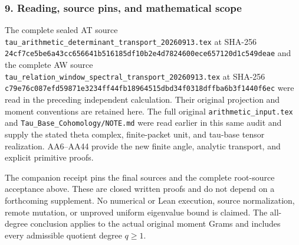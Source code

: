 \subsubsection{9. Reading, source pins, and mathematical scope}\label{endpoint-all_degree_angle_review--reading-source-pins-and-mathematical-scope}

The complete sealed AT source \nolinkurl{tau_arithmetic_determinant_transport_20260913.tex} at SHA-256 \nolinkurl{24cf7ce5be6a43cc656641b516185df10b2e4d7824600ece657120d1c549deae} and the complete AW source \nolinkurl{tau_relation_window_spectral_transport_20260913.tex} at SHA-256 \nolinkurl{c79e76c087efd59871e3234ff44fb18964515dbd34f0318dffba6b3f1440f6ec} were read in the preceding independent calculation. Their original projection and moment conventions are retained here. The full original \nolinkurl{arithmetic_input.tex} and \nolinkurl{Tau_Base_Cohomology/NOTE.md} were read earlier in this same audit and supply the stated theta complex, finite-packet unit, and tau-base tensor realization. AA6--AA44 provide the new finite angle, analytic transport, and explicit primitive proofs.

The companion receipt pins the final sources and the complete root-source acceptance above. These are closed written proofs and do not depend on a forthcoming supplement. No numerical or Lean execution, source normalization, remote mutation, or unproved uniform eigenvalue bound is claimed. The all-degree conclusion applies to the actual original moment Grams and includes every admissible quotient degree \(q\ge1\).
